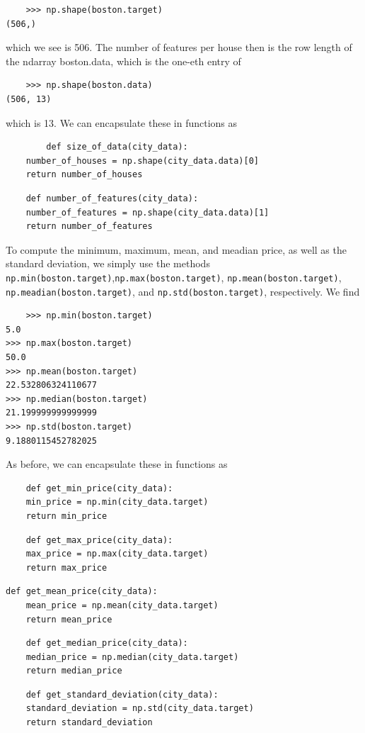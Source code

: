 \documentclass[12 pt]{article}
\numberwithin{equation}{section}
\begin{document}
\begin{verbatim}
	>>> np.shape(boston.target)
(506,)
\end{verbatim}
which we see is 506. The number of features per house then is the row length of the ndarray boston.data, which is the one-eth entry of
\begin{verbatim}
	>>> np.shape(boston.data)
(506, 13)
\end{verbatim}
which is 13. We can encapsulate these in functions as 
\begin{verbatim}
		def size_of_data(city_data):
    number_of_houses = np.shape(city_data.data)[0]
    return number_of_houses
\end{verbatim}
\begin{verbatim}
	def number_of_features(city_data):
    number_of_features = np.shape(city_data.data)[1]
    return number_of_features
\end{verbatim}

To compute the minimum, maximum, mean, and meadian price, as well as the standard deviation, we simply use the methods \texttt{np.min(boston.target)},\texttt{np.max(boston.target)}, \texttt{np.mean(boston.target)}, \texttt{np.meadian(boston.target)}, and \texttt{np.std(boston.target)}, respectively. We find
\begin{verbatim}
	>>> np.min(boston.target)
5.0
>>> np.max(boston.target)
50.0
>>> np.mean(boston.target)
22.532806324110677
>>> np.median(boston.target)
21.199999999999999
>>> np.std(boston.target)
9.1880115452782025
\end{verbatim}
As before, we can encapsulate these in functions as
\begin{verbatim}
	def get_min_price(city_data):
    min_price = np.min(city_data.target)
    return min_price
\end{verbatim}
\begin{verbatim}
	def get_max_price(city_data):
    max_price = np.max(city_data.target)
    return max_price
\end{verbatim}
\begin{verbatim}
def get_mean_price(city_data):
    mean_price = np.mean(city_data.target)
    return mean_price
\end{verbatim}
\begin{verbatim}
	def get_median_price(city_data):
    median_price = np.median(city_data.target)
    return median_price
\end{verbatim}
\begin{verbatim}
	def get_standard_deviation(city_data):
    standard_deviation = np.std(city_data.target)
    return standard_deviation
\end{verbatim}
\end{document}
